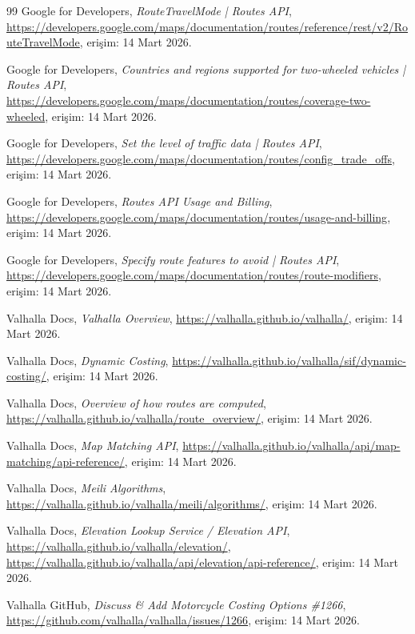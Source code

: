 \documentclass[11pt,a4paper]{article}
\begin{document}
\begin{thebibliography}{99}
Google for Developers, \emph{RouteTravelMode | Routes API}, \url{https://developers.google.com/maps/documentation/routes/reference/rest/v2/RouteTravelMode}, erişim: 14 Mart 2026.

Google for Developers, \emph{Countries and regions supported for two-wheeled vehicles | Routes API}, \url{https://developers.google.com/maps/documentation/routes/coverage-two-wheeled}, erişim: 14 Mart 2026.

Google for Developers, \emph{Set the level of traffic data | Routes API}, \url{https://developers.google.com/maps/documentation/routes/config_trade_offs}, erişim: 14 Mart 2026.

Google for Developers, \emph{Routes API Usage and Billing}, \url{https://developers.google.com/maps/documentation/routes/usage-and-billing}, erişim: 14 Mart 2026.

Google for Developers, \emph{Specify route features to avoid | Routes API}, \url{https://developers.google.com/maps/documentation/routes/route-modifiers}, erişim: 14 Mart 2026.

Valhalla Docs, \emph{Valhalla Overview}, \url{https://valhalla.github.io/valhalla/}, erişim: 14 Mart 2026.

Valhalla Docs, \emph{Dynamic Costing}, \url{https://valhalla.github.io/valhalla/sif/dynamic-costing/}, erişim: 14 Mart 2026.

Valhalla Docs, \emph{Overview of how routes are computed}, \url{https://valhalla.github.io/valhalla/route_overview/}, erişim: 14 Mart 2026.

Valhalla Docs, \emph{Map Matching API}, \url{https://valhalla.github.io/valhalla/api/map-matching/api-reference/}, erişim: 14 Mart 2026.

Valhalla Docs, \emph{Meili Algorithms}, \url{https://valhalla.github.io/valhalla/meili/algorithms/}, erişim: 14 Mart 2026.

Valhalla Docs, \emph{Elevation Lookup Service / Elevation API}, \url{https://valhalla.github.io/valhalla/elevation/}, \url{https://valhalla.github.io/valhalla/api/elevation/api-reference/}, erişim: 14 Mart 2026.

Valhalla GitHub, \emph{Discuss \& Add Motorcycle Costing Options \#1266}, \url{https://github.com/valhalla/valhalla/issues/1266}, erişim: 14 Mart 2026.


\end{thebibliography}
\end{document}
